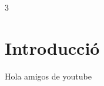 \documentclass[a4paper]{sciposter}
\begin{document}
\selectfont

\begin{multicols}{3}
\section{Introducció}
Hola amigos de youtube
\end{multicols}
\end{document}
